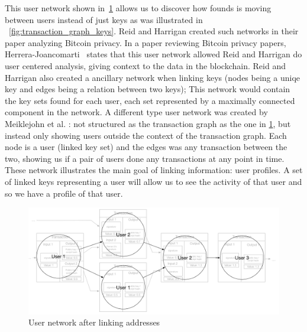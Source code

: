 This user network shown in~\cref{fig:user_graph} allows us to discover how founds is moving between users instead of just keys as was illustrated in ~\cref{fig:transaction_graph_keys}. Reid and Harrigan \cite{reid2013analysis} created such networks in their paper analyzing Bitcoin privacy. In a paper reviewing Bitcoin privacy papers, Herrera-Joancomarti~\cite{herrera2015research} states that this user network allowed Reid and Harrigan do user centered analysis, giving context to the data in the blockchain. Reid and Harrigan also created a ancillary network when linking keys (nodes being a uniqe key and edges being a relation between two keys); This network would contain the key sets found for each user, each set represented by a maximally connected component in the network. A different type user network was created by Meiklejohn et al. \cite{meiklejohn2013fistful}: not structured as the transaction graph as the one in \cref{fig:user_graph}, but instead only showing users outside the context of the transaction graph. Each node is a user (linked key set) and the edges was any transaction between the two, showing us if a pair of users done any transactions at any point in time. These network illustrates the main goal of linking information: user profiles. A set of linked keys representing a user will allow us to see the activity of that user and so we have a profile of that user.\\
 
\begin{figure}[ht]
    \centering
    \includegraphics[width=14cm]{figures/usernetwork_related.png}
    \caption{ User network after linking addresses}
    \label{fig:user_graph}
\end{figure}

